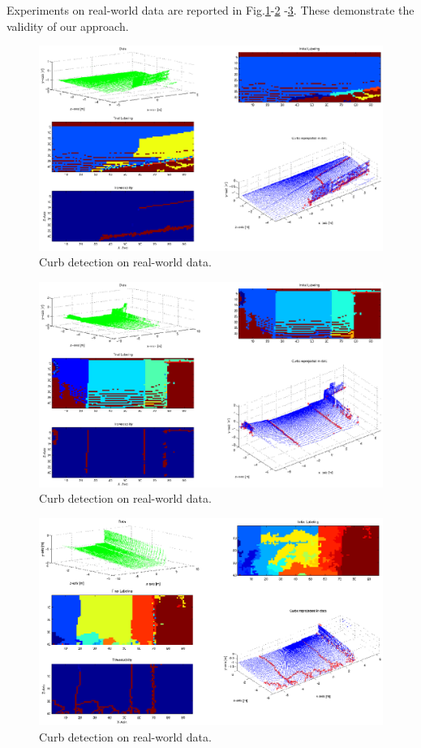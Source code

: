 Experiments on real-world data are reported in Fig.\ref{fig:exp1}-\ref{fig:exp2}
-\ref{fig:exp3}. These demonstrate the validity of our approach.

\begin{figure}[t]
\centering
\includegraphics[width=\columnwidth]{fig/exp1.eps}
\caption{Curb detection on real-world data.}
\label{fig:exp1}
\end{figure}

\begin{figure}[t]
\centering
\includegraphics[width=\columnwidth]{fig/exp2.eps}
\caption{Curb detection on real-world data.}
\label{fig:exp2}
\end{figure}

\begin{figure}[t]
\centering
\includegraphics[width=\columnwidth]{fig/exp3.eps}
\caption{Curb detection on real-world data.}
\label{fig:exp3}
\end{figure}
